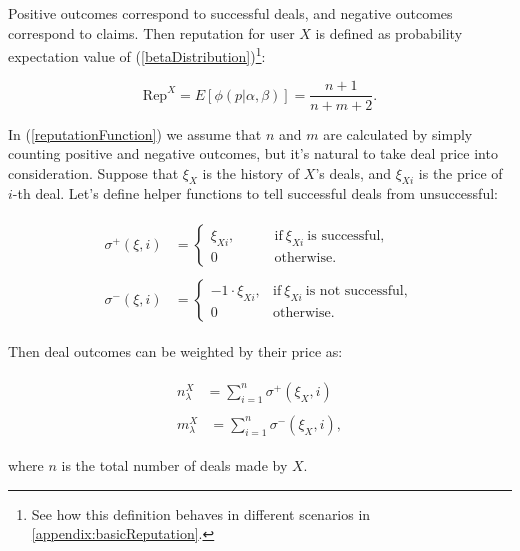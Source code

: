 \documentclass[11pt]{article}
\begin{document}
Positive outcomes correspond to successful deals, and negative outcomes correspond to claims. Then  reputation for user $ X $ is defined as probability expectation value of (\ref{betaDistribution})\footnote{See how this definition behaves in different scenarios in \ref{appendix:basicReputation}.}:

\begin{equation} \label{reputationFunction}
\text{Rep}^{X} = E[\phi(p | \alpha, \beta)] = \frac{n + 1}{n + m + 2}.
\end{equation}

In (\ref{reputationFunction}) we assume that $ n $ and $ m $ are calculated by simply counting positive and negative outcomes, but it's natural to take deal price into consideration. Suppose that $ \xi_{X} $ is the history of $ X $'s deals, and $ \xi_{Xi} $ is the price of $ i $-th deal. Let's define helper functions to tell successful deals from unsuccessful:

\begin{align}
\begin{split}
\sigma^{+}(\xi, i) {}& = \begin{cases} \xi_{Xi}, \qquad & \text{if}\ \xi_{Xi}\ \mbox{is successful}, \\ 0 & \mbox{otherwise.} \end{cases}
\end{split} \\
\begin{split}
\sigma^{-}(\xi, i) {}& = \begin{cases} -1 \cdot \xi_{Xi}, & \text{if}\ \xi_{Xi}\ \mbox{is not successful}, \\ 0 & \mbox{otherwise.} \end{cases}
\end{split}
\end{align}

Then deal outcomes can be weighted by their price as:

\begin{align}
\begin{split}
n_{\lambda}^{X} {}& = \sum_{i = 1}^{n} \sigma^{+}(\xi_X, i)
\end{split} \\
\begin{split}
m_{\lambda}^{X} {}& = \sum_{i = 1}^{n} \sigma^{-}(\xi_X, i),
\end{split}
\end{align}

where $ n $ is the total number of deals made by $ X $.
\end{document}

